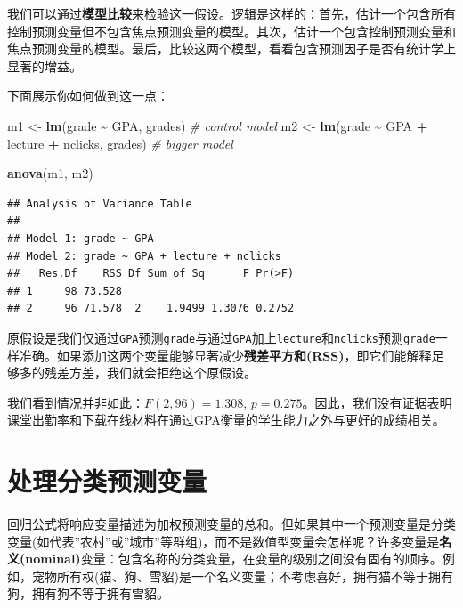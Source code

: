 \documentclass[
]{book}
\newenvironment{Shaded}{\begin{snugshade}}{\end{snugshade}}
\newcommand{\CommentTok}[1]{\textcolor[rgb]{0.56,0.35,0.01}{\textit{#1}}}
\newcommand{\FunctionTok}[1]{\textcolor[rgb]{0.13,0.29,0.53}{\textbf{#1}}}
\newcommand{\NormalTok}[1]{#1}
\newcommand{\OtherTok}[1]{\textcolor[rgb]{0.56,0.35,0.01}{#1}}
\newcommand{\SpecialCharTok}[1]{\textcolor[rgb]{0.81,0.36,0.00}{\textbf{#1}}}
\begin{document}
我们可以通过\textbf{模型比较}来检验这一假设。逻辑是这样的：首先，估计一个包含所有控制预测变量但不包含焦点预测变量的模型。其次，估计一个包含控制预测变量和焦点预测变量的模型。最后，比较这两个模型，看看包含预测因子是否有统计学上显著的增益。

下面展示你如何做到这一点：

\begin{Shaded}
\begin{Highlighting}[]
\NormalTok{m1 }\OtherTok{\textless{}{-}} \FunctionTok{lm}\NormalTok{(grade }\SpecialCharTok{\textasciitilde{}}\NormalTok{ GPA, grades) }\CommentTok{\# control model}
\NormalTok{m2 }\OtherTok{\textless{}{-}} \FunctionTok{lm}\NormalTok{(grade }\SpecialCharTok{\textasciitilde{}}\NormalTok{ GPA }\SpecialCharTok{+}\NormalTok{ lecture }\SpecialCharTok{+}\NormalTok{ nclicks, grades) }\CommentTok{\# bigger model}

\FunctionTok{anova}\NormalTok{(m1, m2)}
\end{Highlighting}
\end{Shaded}

\begin{verbatim}
## Analysis of Variance Table
## 
## Model 1: grade ~ GPA
## Model 2: grade ~ GPA + lecture + nclicks
##   Res.Df    RSS Df Sum of Sq      F Pr(>F)
## 1     98 73.528                           
## 2     96 71.578  2    1.9499 1.3076 0.2752
\end{verbatim}

原假设是我们仅通过\texttt{GPA}预测\texttt{grade}与通过\texttt{GPA}加上\texttt{lecture}和\texttt{nclicks}预测\texttt{grade}一样准确。如果添加这两个变量能够显著减少\textbf{残差平方和(RSS)}，即它们能解释足够多的残差方差，我们就会拒绝这个原假设。

我们看到情况并非如此：\(F(2,96) = 1.308\), \(p =0.275\)。因此，我们没有证据表明课堂出勤率和下载在线材料在通过GPA衡量的学生能力之外与更好的成绩相关。

\hypertarget{ux5904ux7406ux5206ux7c7bux9884ux6d4bux53d8ux91cf}{%
\section{处理分类预测变量}\label{ux5904ux7406ux5206ux7c7bux9884ux6d4bux53d8ux91cf}}

回归公式将响应变量描述为加权预测变量的总和。但如果其中一个预测变量是分类变量(如代表''农村''或''城市''等群组)，而不是数值型变量会怎样呢？许多变量是\textbf{名义(nominal)}变量：包含名称的分类变量，在变量的级别之间没有固有的顺序。例如，宠物所有权(猫、狗、雪貂)是一个名义变量；不考虑喜好，拥有猫不等于拥有狗，拥有狗不等于拥有雪貂。
\end{document}
